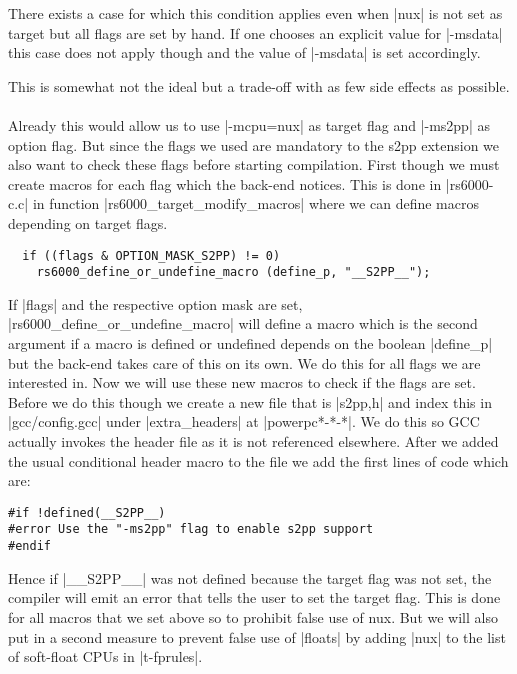 There exists a case for which this condition applies even when |nux| is not set as target but all flags are set by hand.
If one chooses an explicit value for |-msdata| this case does not apply though and the value of |-msdata| is set accordingly.

This is somewhat not the ideal but a trade-off with as few side effects as possible.
\\
\\
Already this would allow us to use |-mcpu=nux| as target flag and |-ms2pp| as option flag.
But since the flags we used are mandatory to the s2pp extension we also want to check these flags before starting compilation.
First though we must create macros for each flag which the back-end notices.
This is done in |rs6000-c.c| in function |rs6000_target_modify_macros| where we can define macros depending on target flags.
\begin{lstlisting}
  if ((flags & OPTION_MASK_S2PP) != 0)
    rs6000_define_or_undefine_macro (define_p, "__S2PP__");
\end{lstlisting}

If |flags| and the respective option mask are set, |rs6000_define_or_undefine_macro| will define a macro which is the second argument if a macro is defined or undefined depends on the boolean |define_p| but the back-end takes care of this on its own.
We do this for all flags we are interested in.
Now we will use these new macros to check if the flags are set.
Before we do this though we create a new file that is |s2pp,h| and index this in |gcc/config.gcc| under |extra_headers| at |powerpc*-*-*|.
We do this so GCC actually invokes the header file as it is not referenced elsewhere.
After we added the usual conditional header macro to the file we add the first lines of code which are:
\begin{lstlisting}
#if !defined(__S2PP__)
#error Use the "-ms2pp" flag to enable s2pp support
#endif
\end{lstlisting}
Hence if |__S2PP__| was not defined because the target flag was not set, the compiler will emit an error that tells the user to set the target flag.
This is done for all macros that we set above so to prohibit false use of nux.
But we will also put in a second measure to prevent false use of |floats| by adding |nux| to the list of soft-float CPUs in |t-fprules|.


